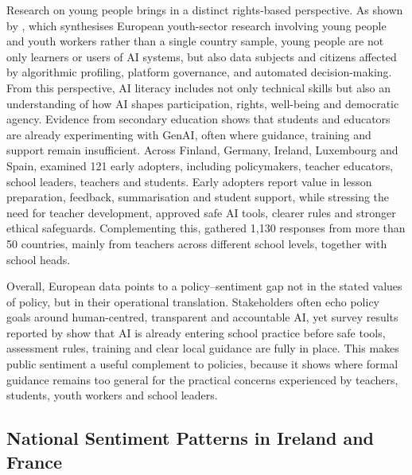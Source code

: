 Research on young people brings in a distinct rights-based perspective. As shown by
\cite{stefan2024aiyouth}, which synthesises European youth-sector research involving
young people and youth workers rather than a single country sample, young people are
not only learners or users of AI systems, but also data subjects and citizens
affected by algorithmic profiling, platform governance, and automated
decision-making. From this perspective, AI literacy includes not only technical
skills but also an understanding of how AI shapes participation, rights, well-being
and democratic agency. Evidence from secondary education shows that students and
educators are already experimenting with GenAI, often where guidance, training and
support remain insufficient. Across Finland, Germany, Ireland, Luxembourg and Spain,
\cite{villar2025genai} examined 121 early adopters, including policymakers, teacher
educators, school leaders, teachers and students. Early adopters report value in
lesson preparation, feedback, summarisation and student support, while stressing the
need for teacher development, approved safe AI tools, clearer rules and stronger
ethical safeguards. Complementing this, \cite{esep2026aisurvey} gathered 1,130
responses from more than 50 countries, mainly from teachers across different school
levels, together with school heads.

Overall, European data points to a policy--sentiment gap not in the stated values of
policy, but in their operational translation. Stakeholders often echo policy goals
around human-centred, transparent and accountable AI, yet survey results reported by
\cite{esep2026aisurvey} show that AI is already entering school practice before safe
tools, assessment rules, training and clear local guidance are fully in place. This
makes public sentiment a useful complement to policies, because it shows where formal
guidance remains too general for the practical concerns experienced by teachers,
students, youth workers and school leaders.

\subsection{National Sentiment Patterns in Ireland and France}

